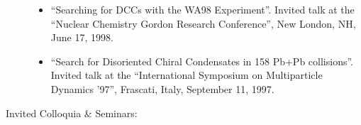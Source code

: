 \documentclass[11 pt]{article}
\begin{document}
\begin{description}
\begin{itemize}
\item ``Searching for DCCs with the WA98 Experiment''.  Invited talk at the ``Nuclear Chemistry Gordon Research Conference'', New London, NH, June 17, 1998.
\item ``Search for Disoriented Chiral Condensates in 158 Pb+Pb collisions''.  Invited talk at the ``International Symposium on Multiparticle Dynamics '97'', Frascati, Italy, September 11, 1997.
\end{itemize}

\item[Invited Colloquia \& Seminars:]\
\begin{itemize}


\end{itemize}
\end{description}
\end{document}
